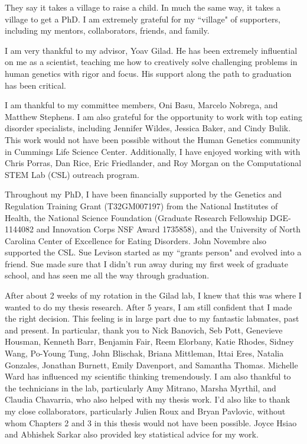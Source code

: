 \acknowledgments

They say it takes a village to raise a child. In much the same way, it takes a village to get a PhD. I am extremely grateful for my ``village" of supporters, including my mentors, collaborators, friends, and family.

I am very thankful to my advisor, Yoav Gilad. He has been extremely influential on me as a scientist, teaching me how to creatively solve challenging problems in human genetics with rigor and focus. His support along the path to graduation has been critical. 

I am thankful to my committee members, Oni Basu, Marcelo Nobrega, and Matthew Stephens. I am also grateful for the opportunity to work with top eating disorder specialists, including Jennifer Wildes, Jessica Baker, and Cindy Bulik. This work would not have been possible without the Human Genetics
community in Cummings Life Science Center. Additionally, I have enjoyed working with with Chris Porras, Dan Rice, Eric Friedlander, and Roy Morgan on the Computational STEM Lab (CSL) outreach program. 

Throughout my PhD, I have been financially supported by the Genetics and Regulation Training Grant (T32GM007197) from the National Institutes
of Health, the National Science Foundation (Graduate Research Fellowship DGE-1144082 and Innovation Corps NSF Award 1735858), and the University of North Carolina Center of Excellence for Eating Disorders. John Novembre also supported the CSL. Sue Levison started as my ``grants person" and evolved into a friend. Sue made sure that I didn't run away during my first week of graduate school, and has seen me all the way through graduation.   

After about 2 weeks of my rotation in the Gilad lab, I knew that this was where I wanted to do my thesis research. After 5 years, I am still confident that I made the right decision. This feeling is in large part due to my fantastic labmates, past and present. In particular, thank you to Nick Banovich, Seb Pott, Genevieve Housman, Kenneth Barr, Benjamin Fair, Reem Elorbany, Katie Rhodes, Sidney Wang, Po-Young Tung, John Blischak, Briana Mittleman, Ittai Eres, Natalia Gonzales, Jonathan Burnett, Emily Davenport, and Samantha Thomas. Michelle Ward has influenced my scientific thinking tremendously. I am also thankful to the technicians in the lab, particularly Amy Mitrano,
Marsha Myrthil, and Claudia Chavarria, who also helped with my thesis work. I'd also like to thank my close collaborators, particularly Julien Roux and Bryan Pavlovic, without whom Chapters 2 and 3 in this thesis would not have been possible. Joyce Hsiao and Abhishek Sarkar also provided key statistical advice for my work. 

